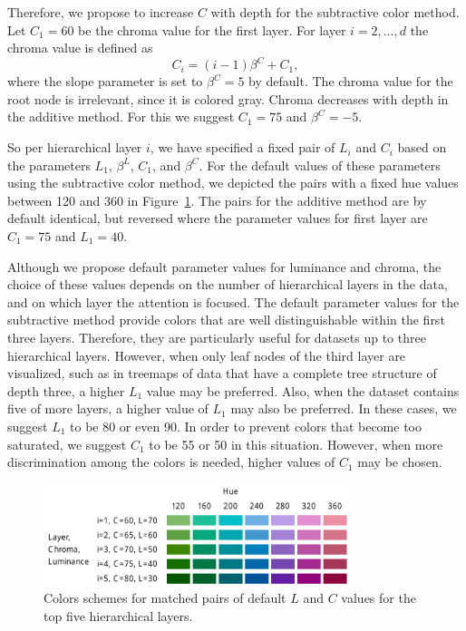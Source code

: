\documentclass[journal]{vgtc}                %
\begin{document}
Therefore, we propose to increase $C$ with depth for the subtractive color method. Let $C_1=60$ be the chroma value for the first layer. For layer $i=2,\ldots, d$ the chroma value is defined as
\begin{equation}
C_i=(i-1)\beta^C + C_1,
\end{equation}
where the slope parameter is set to $\beta^C=5$ by default. The chroma value for the root node is irrelevant, since it is colored gray. Chroma decreases with depth in the additive method. For this we suggest $C_1=75$ and $\beta^C=-5$.

So per hierarchical layer $i$, we have specified a fixed pair of $L_i$ and $C_i$ based on the parameters $L_1$, $\beta^L$, $C_1$, and $\beta^C$. For the default values of these parameters using the subtractive color method, we depicted the pairs with a fixed hue values between 120 and 360 in Figure~\ref{fig:lc3}. The pairs for the additive method are by default identical, but reversed where the parameter values for first layer are $C_1=75$ and $L_1=40$.

Although we propose default parameter values for luminance and chroma, the choice of these values depends on the number of hierarchical layers in the data, and on which layer the attention is focused. The default parameter values for the subtractive method provide colors that are well distinguishable within the first three layers. Therefore, they are particularly useful for datasets up to three hierarchical layers. However, when only leaf nodes of the third layer are visualized, such as in treemaps of data that have a complete tree structure of depth three, a higher $L_1$ value may be preferred. Also, when the dataset contains five of more layers, a higher value of $L_1$ may also be preferred. In these cases, we suggest $L_1$ to be 80 or even 90. In order to prevent colors that become too saturated, we suggest $C_1$ to be 55 or 50 in this situation. However, when more discrimination among the colors is needed, higher values of $C_1$ may be chosen.

\begin{figure}[!t]
  \centering
  \includegraphics[width=3.5in]{LC3.pdf}
  \caption{Colors schemes for matched pairs of default $L$ and $C$ values for the top five hierarchical layers.}\label{fig:lc3}
\end{figure}
\end{document}
